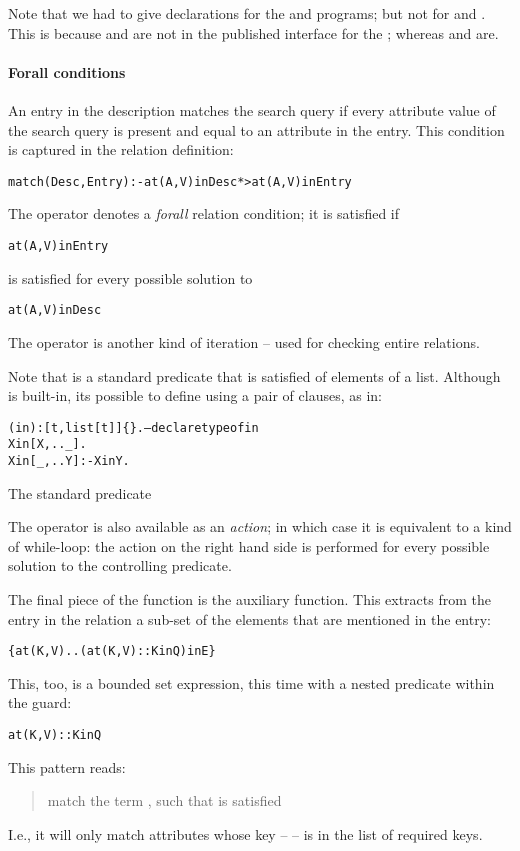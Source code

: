 Note that we had to give declarations for the  and  programs; but not for  and . This is because  and  are not in the published interface for the ; whereas  and  are.

\paragraph{Forall conditions}
An entry in the description matches the search query if every attribute value of the search query is present and equal to an attribute in the entry. This condition is captured in the  relation definition:
\begin{alltt}
match(Desc,Entry) :- at(A,V) in Desc *> at(A,V) in Entry
\end{alltt}
The \q{*>} operator denotes a \emph{forall} relation condition; it is satisfied if 
\begin{alltt}
at(A,V) in Entry
\end{alltt}
is satisfied for every possible solution to
\begin{alltt}
at(A,V) in Desc
\end{alltt}
The \q{*>} operator is another kind of iteration -- used for checking entire relations.

Note that  is a standard predicate that is satisfied of elements of a list. Although  is built-in, its possible to define  using a pair of clauses, as in:
\begin{program}
\vspace{0.5ex}
\begin{alltt}
(in):[t,list[t]]\{\}.  -- declare type of in
X in [X,.._].
X in [_,..Y] :- X in Y.
\end{alltt}
\vspace{-2ex}
\caption{The standard  predicate\label{standard:in}}
\end{program}

\begin{aside}
The \q{*>} operator is also available as an \emph{action}; in which case it is equivalent to a kind of while-loop: the action on the right hand side is performed for every possible solution to the controlling predicate.
\end{aside}

\noindent
The final piece of the  function is the  auxiliary function. This extracts from the entry in the  relation a sub-set of the   elements that are mentioned in the entry:
\begin{alltt}
\{ at(K,V) .. (at(K,V)::K in Q) in E \}
\end{alltt}
This, too, is a bounded set expression, this time with a nested  predicate within the guard:
\begin{alltt}
at(K,V)::K in Q
\end{alltt}
This pattern reads:
\begin{quote}
match the term , such that  is satisfied
\end{quote}
I.e., it will only match attributes whose key --  -- is in the list of required keys.

